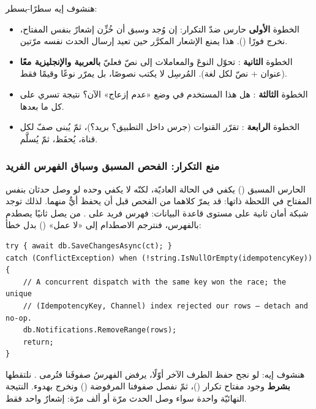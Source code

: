 هنشوف إيه سطرًا-بسطر:
\begin{itemize}
\item الخطوة \textbf{الأولى} حارس ضدّ التكرار: إن وُجد  وسبق أن
  خُزِّن إشعارٌ بنفس المفتاح، نخرج فورًا (). هذا يمنع الإشعار المكرَّر
  حين تعيد  إرسال الحدث نفسه مرّتين.
\item الخطوة \textbf{الثانية} : تحوّل النوعَ والمعاملات إلى نصّ
  فعليّ \textbf{بالعربية والإنجليزية معًا} (عنوان + نصّ لكل لغة). المُرسِل لا يكتب
  نصوصًا، بل يمرّر نوعًا وقيمًا فقط.
\item الخطوة \textbf{الثالثة} : هل هذا المستخدم في وضع «عدم
  إزعاج» الآن؟ نتيجة  تسري على كل ما بعدها.
\item الخطوة \textbf{الرابعة} : تقرّر القنوات (جرس داخل
  التطبيق؟ بريد؟)، ثمّ يُبنى صفّ  لكل قناة، يُحفَظ، ثمّ يُسلَّم.
\end{itemize}

\subsubsection{منع التكرار: الفحص المسبق وسباق الفهرس الفريد}

الحارس المسبق () يكفي في الحالة العاديّة، لكنّه لا يكفي وحده لو وصل
حدثان بنفس المفتاح في اللحظة ذاتها: قد يمرّ كلاهما من الفحص قبل أن يحفظ أيٌّ منهما.
لذلك توجد شبكة أمان ثانية على مستوى قاعدة البيانات: فهرس فريد على
. من يصل ثانيًا يصطدم بالفهرس، فنترجم الاصطدام إلى
«لا عمل» () بدل خطأ:

\begin{english}
\begin{lstlisting}[language={[Sharp]C}]
try { await db.SaveChangesAsync(ct); }
catch (ConflictException) when (!string.IsNullOrEmpty(idempotencyKey))
{
    // A concurrent dispatch with the same key won the race; the unique
    // (IdempotencyKey, Channel) index rejected our rows — detach and no-op.
    db.Notifications.RemoveRange(rows);
    return;
}
\end{lstlisting}
\end{english}

هنشوف إيه: لو نجح حفظ الطرف الآخر أوّلًا، يرفض الفهرسُ صفوفَنا فتُرمى
. نلتقطها \textbf{بشرط} وجود مفتاح تكرار ()، ثمّ
نفصل صفوفنا المرفوضة () ونخرج بهدوء. النتيجة النهائيّة واحدة سواء
وصل الحدث مرّة أو ألف مرّة: إشعارٌ واحد فقط.

